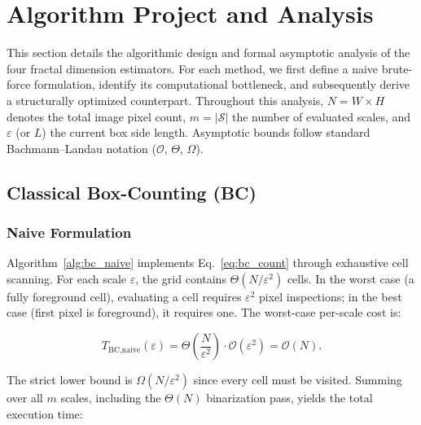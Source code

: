 \section{Algorithm Project and Analysis}
\label{sec:algorithms}

This section details the algorithmic design and formal asymptotic analysis of the four fractal dimension estimators. For each method, we first define a naive brute-force formulation, identify its computational bottleneck, and subsequently derive a structurally optimized counterpart. Throughout this analysis, $N = W \times H$ denotes the total image pixel count, $m = |\mathcal{S}|$ the number of evaluated scales, and $\varepsilon$ (or $L$) the current box side length. Asymptotic bounds follow standard Bachmann–Landau notation ($\mathcal{O}$, $\Theta$, $\Omega$).

\subsection{Classical Box-Counting (BC)}
\label{subsec:bc}

\subsubsection{Naive Formulation}

Algorithm~\ref{alg:bc_naive} implements Eq.~\eqref{eq:bc_count} through exhaustive cell scanning. For each scale $\varepsilon$, the grid contains $\Theta(N/\varepsilon^{2})$ cells. In the worst case (a fully foreground cell), evaluating a cell requires $\varepsilon^{2}$ pixel inspections; in the best case (first pixel is foreground), it requires one. The worst-case per-scale cost is:

\begin{equation}
  T_{\text{BC,naive}}(\varepsilon)
    = \Theta\!\left(\frac{N}{\varepsilon^{2}}\right)
      \cdot \mathcal{O}(\varepsilon^{2})
    = \mathcal{O}(N).
\end{equation}

The strict lower bound is $\Omega(N/\varepsilon^{2})$ since every cell must be visited. Summing over all $m$ scales, including the $\Theta(N)$ binarization pass, yields the total execution time:

